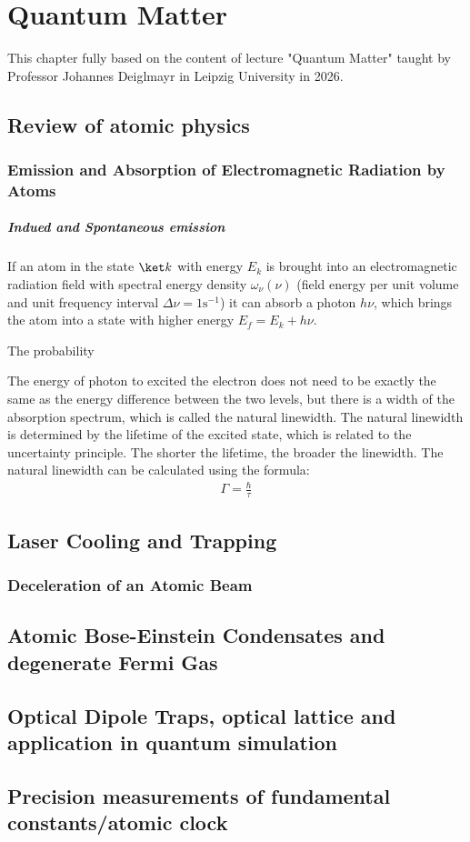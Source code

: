 \chapter{Quantum Matter}

This chapter fully based on the content of lecture "Quantum Matter" taught by Professor Johannes Deiglmayr in Leipzig University in 2026.
\section{Review of atomic physics}
\subsection{Emission and Absorption of Electromagnetic Radiation by Atoms}
\paragraph{Indued and Spontaneous emission}
If an atom in the state $\ket k$ with energy $E_k$ is brought into an electromagnetic radiation field with spectral energy density $\omega_{\nu}(\nu)$ (field energy per unit volume and unit frequency interval $\Delta \nu = 1\mathrm{s}^{-1}$) it can absorb a photon $h \nu$, which brings the atom into a state with higher energy $E_{f}=E_{k}+ h \nu$.

The probability 




The energy of photon to excited the electron does not need to be exactly the same as the energy difference between the two levels, but there is a width of the absorption spectrum, which is called the natural linewidth. The natural linewidth is determined by the lifetime of the excited state, which is related to the uncertainty principle. The shorter the lifetime, the broader the linewidth. The natural linewidth can be calculated using the formula:
\begin{align}
\Gamma = \frac{\hbar}{\tau}
\end{align}
\section{Laser Cooling and Trapping}
\subsection{Deceleration of an Atomic Beam}

\section{Atomic Bose-Einstein Condensates and degenerate Fermi Gas}

\section{Optical Dipole Traps, optical lattice and application in quantum simulation}

\section{Precision measurements of fundamental constants/atomic clock}